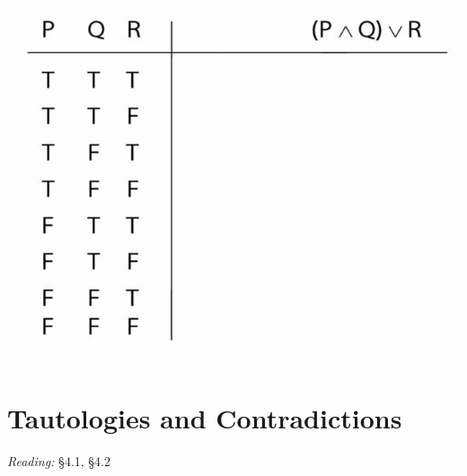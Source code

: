 \documentclass[12pt]{extarticle}
\begin{document}
\begin{multicols*}{3}
\begin{minipage}{\columnwidth}
\begin{center}
\includegraphics[scale=0.3]{img/tt_p_and_q_or_r.png}
\end{center}
\end{minipage}
 
 
 
\section{Tautologies and Contradictions}
 
\emph{Reading:} §4.1, §4.2
 

\end{multicols*}
\end{document}

